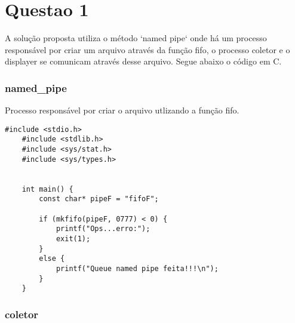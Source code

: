 \chapter{Questao 1}

A solução proposta utiliza o método `named pipe` onde há um processo responsável por criar um arquivo através da função fifo, o processo coletor e o displayer se comunicam através desse arquivo.
Segue abaixo o código em C.

\subsection*{named\_pipe}
Processo responsável por criar o arquivo utlizando a função fifo.

\begin{lstlisting}[style=CStyle]
    #include <stdio.h>
    #include <stdlib.h>
    #include <sys/stat.h>
    #include <sys/types.h>
    
    
    int main() {
        const char* pipeF = "fifoF";
    
        if (mkfifo(pipeF, 0777) < 0) {
            printf("Ops...erro:");
            exit(1);
        }
        else {
            printf("Queue named pipe feita!!!\n");
        }
    }
\end{lstlisting}


\subsection*{coletor}

